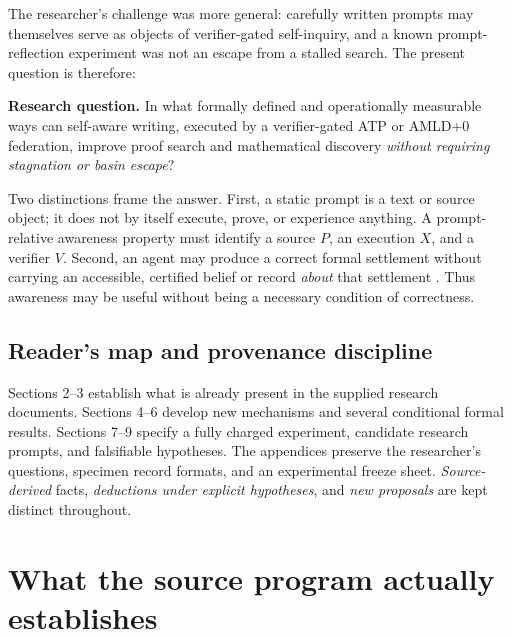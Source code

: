 \documentclass[11pt,letterpaper]{article}
\begin{document}
The researcher's challenge was more general: carefully written prompts may themselves serve as objects of verifier-gated self-inquiry, and a known prompt-reflection experiment was not an escape from a stalled search. The present question is therefore:
\begin{researchprompt}
\textbf{Research question.} In what formally defined and operationally measurable ways can self-aware writing, executed by a verifier-gated ATP or AMLD+0 federation, improve proof search and mathematical discovery \emph{without requiring stagnation or basin escape}?
\end{researchprompt}

Two distinctions frame the answer. First, a static prompt is a text or source object; it does not by itself execute, prove, or experience anything. A prompt-relative awareness property must identify a source $P$, an execution $X$, and a verifier $V$. Second, an agent may produce a correct formal settlement without carrying an accessible, certified belief or record \emph{about} that settlement \cite{lowaware}. Thus awareness may be useful without being a necessary condition of correctness.

\subsection{Reader's map and provenance discipline}
Sections 2--3 establish what is already present in the supplied research documents. Sections 4--6 develop new mechanisms and several conditional formal results. Sections 7--9 specify a fully charged experiment, candidate research prompts, and falsifiable hypotheses. The appendices preserve the researcher's questions, specimen record formats, and an experimental freeze sheet. \emph{Source-derived} facts, \emph{deductions under explicit hypotheses}, and \emph{new proposals} are kept distinct throughout.

\section{What the source program actually establishes}
\end{document}
